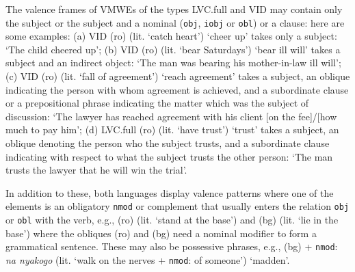 \documentclass[output=paper,colorlinks,citecolor=brown]{langscibook}
\begin{document}
The valence frames of VMWEs of the types LVC.full and VID may contain only the subject or the subject and a nominal (\texttt{obj}, \texttt{iobj} or \texttt{obl}) or a clause: here are some examples: 
(a) VID (ro)  (lit. `catch heart') {`cheer up'} 
takes only a subject:  {`The child cheered up'}; 
(b) VID (ro)  (lit. `bear Saturdays') {`bear ill will'} 
takes a subject and an indirect object:  {`The man was bearing his mother-in-law ill will'}; 
(c) VID (ro)  (lit. `fall of agreement') {`reach agreement'} 
takes a subject, an oblique indicating the person with whom agreement is achieved, and a subordinate clause or a prepositional phrase indicating the matter which was the subject of discussion:  {`The lawyer has reached agreement with his client [on the fee]/[how much to pay him'}; 
(d) LVC.full (ro)  (lit. `have trust') {`trust'} 
takes a subject, an oblique denoting the person who the subject trusts, and a subordinate clause indicating with respect to what the subject trusts the other person:  {`The man trusts the lawyer that he will win the trial'}.

In addition to these, both languages display valence patterns where one of the elements is an obligatory \texttt{nmod} or complement that usually enters the relation \texttt{obj} or \texttt{obl} with the verb, e.g., (ro)  (lit. `stand at the base') and (bg)  (lit. `lie in the base') where the obliques (ro)  and (bg)  need a nominal modifier to form a grammatical sentence. These may also be possessive phrases, e.g., (bg)  + \texttt{nmod}: \textit{na nyakogo} (lit. `walk on the nerves  + \texttt{nmod}: of someone') `madden'.   
\end{document}
